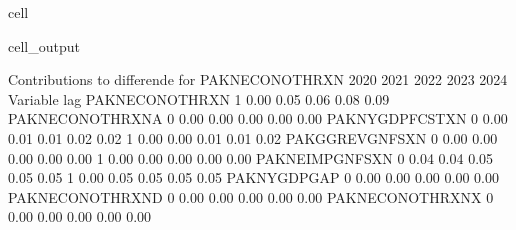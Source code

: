 \documentclass[letterpaper,10pt,english]{jupyterBook}
\begin{document}
\begin{sphinxuseclass}{cell}
\begin{sphinxVerbatimOutput}
\begin{sphinxuseclass}{cell_output}
\begin{sphinxVerbatim}[commandchars=\\\{\}]
 Contributions to differende for  PAKNECONOTHRXN
                           2020       2021       2022       2023       2024
Variable         lag                                                       
PAKNECONOTHRXN   \PYGZhy{}1       \PYGZhy{}0.00       0.05       0.06       0.08       0.09
PAKNECONOTHRXN\PYGZus{}A  0       \PYGZhy{}0.00      \PYGZhy{}0.00      \PYGZhy{}0.00      \PYGZhy{}0.00      \PYGZhy{}0.00
PAKNYGDPFCSTXN    0        0.00       0.01       0.01       0.02       0.02
                 \PYGZhy{}1       \PYGZhy{}0.00      \PYGZhy{}0.00      \PYGZhy{}0.01      \PYGZhy{}0.01      \PYGZhy{}0.02
PAKGGREVGNFSXN    0       \PYGZhy{}0.00      \PYGZhy{}0.00      \PYGZhy{}0.00      \PYGZhy{}0.00      \PYGZhy{}0.00
                 \PYGZhy{}1       \PYGZhy{}0.00      \PYGZhy{}0.00      \PYGZhy{}0.00      \PYGZhy{}0.00      \PYGZhy{}0.00
PAKNEIMPGNFSXN    0        0.04       0.04       0.05       0.05       0.05
                 \PYGZhy{}1       \PYGZhy{}0.00      \PYGZhy{}0.05      \PYGZhy{}0.05      \PYGZhy{}0.05      \PYGZhy{}0.05
PAKNYGDPGAP\PYGZus{}      0        0.00       0.00       0.00       0.00       0.00
PAKNECONOTHRXN\PYGZus{}D  0       \PYGZhy{}0.00      \PYGZhy{}0.00      \PYGZhy{}0.00      \PYGZhy{}0.00      \PYGZhy{}0.00
PAKNECONOTHRXN\PYGZus{}X  0       \PYGZhy{}0.00      \PYGZhy{}0.00      \PYGZhy{}0.00      \PYGZhy{}0.00      \PYGZhy{}0.00


\end{sphinxVerbatim}
\end{sphinxuseclass}
\end{sphinxVerbatimOutput}
\end{sphinxuseclass}
\end{document}
